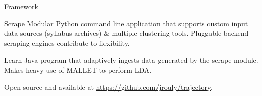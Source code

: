 \documentclass{beamer}
\begin{document}
  \begin{frame}{Framework}

    \begin{block}{Scrape}
      Modular Python command line application that supports custom input
      data sources (syllabus archives) \& multiple clustering tools.
      Pluggable backend scraping engines contribute to flexibility.
    \end{block}

    \vfill

    \begin{block}{Learn}
      Java program that adaptively ingests data generated by the scrape
      module. Makes heavy use of MALLET to perform LDA.
    \end{block}

    \vfill

    Open source and available at \url{https://github.com/jrouly/trajectory}.

  \end{frame}
\end{document}
